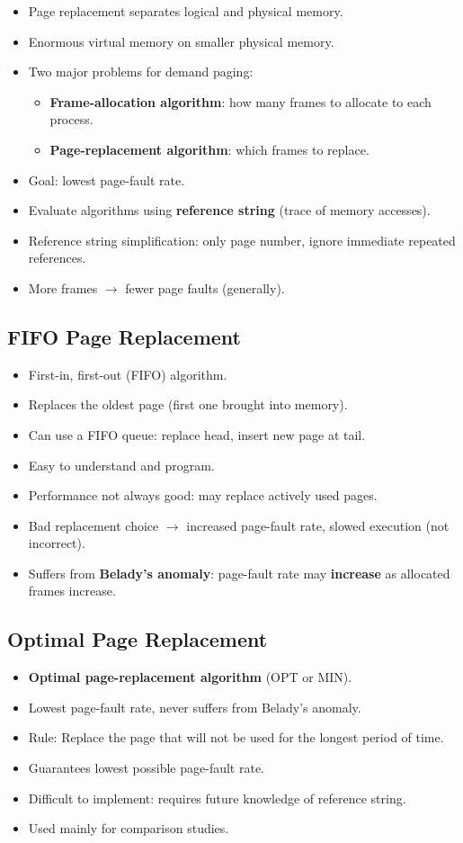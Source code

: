 \begin{itemize}
    \item Page replacement separates logical and physical memory.
    \item Enormous virtual memory on smaller physical memory.
    \item Two major problems for demand paging:
    \begin{itemize}
        \item \textbf{Frame-allocation algorithm}: how many frames to allocate to each process.
        \item \textbf{Page-replacement algorithm}: which frames to replace.
    \end{itemize}
    \item Goal: lowest page-fault rate.
    \item Evaluate algorithms using \textbf{reference string} (trace of memory accesses).
    \item Reference string simplification: only page number, ignore immediate repeated references.
    \item More frames $\rightarrow$ fewer page faults (generally).
\end{itemize}

\subsection{FIFO Page Replacement}
\begin{itemize}
    \item First-in, first-out (FIFO) algorithm.
    \item Replaces the oldest page (first one brought into memory).
    \item Can use a FIFO queue: replace head, insert new page at tail.
    \item Easy to understand and program.
    \item Performance not always good: may replace actively used pages.
    \item Bad replacement choice $\rightarrow$ increased page-fault rate, slowed execution (not incorrect).
    \item Suffers from \textbf{Belady's anomaly}: page-fault rate may \textbf{increase} as allocated frames increase.
\end{itemize}

\subsection{Optimal Page Replacement}
\begin{itemize}
    \item \textbf{Optimal page-replacement algorithm} (OPT or MIN).
    \item Lowest page-fault rate, never suffers from Belady's anomaly.
    \item Rule: Replace the page that will not be used for the longest period of time.
    \item Guarantees lowest possible page-fault rate.
    \item Difficult to implement: requires future knowledge of reference string.
    \item Used mainly for comparison studies.
\end{itemize}

